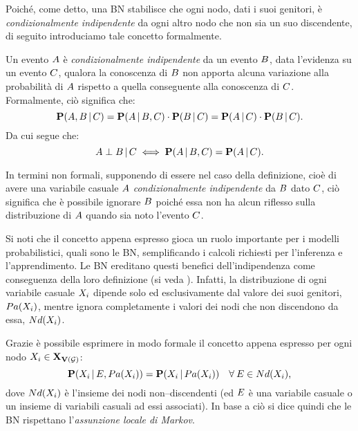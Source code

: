 Poiché, come detto, una \acl{BN} stabilisce che ogni nodo, dati i suoi genitori, è \emph{condizionalmente indipendente} da ogni altro nodo che non sia un suo discendente, di seguito introduciamo tale concetto formalmente.
\begin{definizione}\label{defn:ic}
Un evento $\mathnormal{A}$ è \emph{condizionalmente indipendente} da un evento $\mathnormal{B}$, data l'evidenza su un evento $\mathnormal{C}$, qualora la conoscenza di $\mathnormal{B}$ non apporta alcuna variazione alla probabilità di $\mathnormal{A}$ rispetto a quella conseguente alla conoscenza di $\mathnormal{C}$.
Formalmente, ciò significa che:
\[
\mathbf{P}(\mathnormal{A},\mathnormal{B}\,\arrowvert\,\mathnormal{C})=\mathbf{P}(\mathnormal{A}\,\arrowvert\,\mathnormal{B},\mathnormal{C})\cdot\mathbf{P}(\mathnormal{B}\,\arrowvert\,\mathnormal{C})=\mathbf{P}(\mathnormal{A}\,\arrowvert\,\mathnormal{C})\cdot\mathbf{P}(\mathnormal{B}\,\arrowvert\,\mathnormal{C})\text{.}
\]
Da cui segue che:
\[
\mathnormal{A}\perp\mathnormal{B}\,\arrowvert\,\mathnormal{C}\iff\mathbf{P}(\mathnormal{A}\,\arrowvert\,\mathnormal{B},\mathnormal{C})=\mathbf{P}(\mathnormal{A}\,\arrowvert\,\mathnormal{C})\text{.}
\]
\end{definizione}
In termini non formali, supponendo di essere nel caso della definizione, cioè di avere una variabile casuale $\mathnormal{A}$ \emph{condizionalmente indipendente} da $\mathnormal{B}$ dato $\mathnormal{C}$, ciò significa che è possibile ignorare $\mathnormal{B}$ poiché essa non ha alcun riflesso sulla distribuzione \cond*{} di $\mathnormal{A}$ quando sia noto l'evento $\mathnormal{C}$.

Si noti che il concetto appena espresso gioca un ruolo importante per i modelli probabilistici, quali sono le \acl{BN}, semplificando i calcoli richiesti per l'inferenza e l'apprendimento. Le \acl{BN} ereditano questi benefici dell'indipendenza \cond*{} come conseguenza della loro definizione (si veda ). Infatti, la distribuzione \cond*{} di ogni variabile casuale $\mathnormal{X_i}$ dipende solo ed esclusivamente dal valore dei suoi genitori, $Pa(\mathnormal{X_i})$, mentre ignora completamente i valori dei nodi che non discendono da essa, $Nd(\mathnormal{X_i})$.

Grazie  è possibile esprimere in modo formale il concetto appena espresso per ogni nodo $\mathnormal{X_i}\in\mathbf{X}_{\mathbf{V}(\mathcal{G})}$:
\[
\mathbf{P}(\mathnormal{X_i}\,\arrowvert\,\mathnormal{E},Pa(\mathnormal{X_i}))=\mathbf{P}(\mathnormal{X_i}\,\arrowvert\,Pa(\mathnormal{X_i})) \quad \forall\:\mathnormal{E}\in Nd(\mathnormal{X_i})\text{,}
\]
dove $Nd(\mathnormal{X_i})$ è l'insieme dei nodi non--discendenti (ed $\mathnormal{E}$ è una variabile casuale o un insieme di variabili casuali ad essi associati).
In base a ciò si dice quindi che le \acl{BN} rispettano l'\emph{assunzione locale di Markov}.

